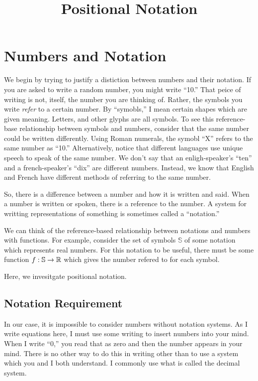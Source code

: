\documentclass{article}
\title{Positional Notation}
\begin{document}
	\boldtitle
	
	
	\section{Numbers and Notation}
	We begin by trying to justify a distiction between numbers and their notation. If you are asked to write a random number, you might write ``10.'' That peice of writing is not, itself, the number you are thinking of. Rather, the symbols you write \textit{refer} to a certain number. By ``symobls,'' I mean certain shapes which are given meaning. Letters, and other glyphs are all symbols. To see this reference-base relationship between symbols and numbers, consider that the same number could be written differently. Using Roman numerals, the symobl ``X'' refers to the same number as ``10.'' Alternatively, notice that different languages use unique speech to speak of the same number. We don't say that an enligh-speaker's ``ten'' and a french-speaker's ``dix'' are different numbers. Instead, we know that English and French have different methods of referring to the same number.
	
	So, there is a difference between a number and how it is written and said. When a number is written or spoken, there is a reference to the number. A system for writting representations of something is sometimes called a ``notation.''
	
	We can think of the reference-based relationship between notations and numbers with functions. For example, consider the set of symbols $\mathbb{S}$ of some notation which represents real numbers. For this notation to be useful, there must be some function $f:\mathbb{S}\rightarrow\mathbb{R}$ which gives the number refered to for each symbol.
	
	Here, we invesitgate positional notation.
	
	\subsection{Notation Requirement}
	In our case, it is impossible to consider numbers without notation systems. As I write equations here, I must use some writing to insert numbers into your mind. When I write ``0,'' you read that as zero and then the number appears in your mind. There is no other way to do this in writing other than to use a system which you and I both understand. I commonly use what is called the decimal system.
	
\end{document}
